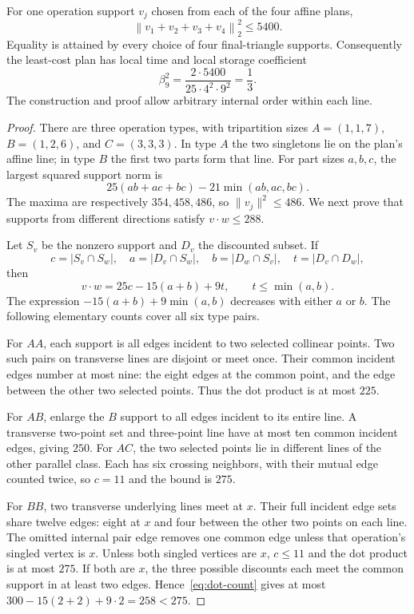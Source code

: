 \begin{theorem}\label{thm:affine}
For one operation support $v_j$ chosen from each of the four affine plans,
\[
 \left\|v_1+v_2+v_3+v_4\right\|_2^2\le5400.
\]
Equality is attained by every choice of four final-triangle supports.
Consequently the least-cost plan has local time and local storage coefficient
\begin{equation}
 \beta_9^2=\frac{2\cdot5400}{25\cdot4^2\cdot9^2}
   =\frac13.\label{eq:affine-beta}
\end{equation}
The construction and proof allow arbitrary internal order within each line.
\end{theorem}

\begin{proof}
There are three operation types, with tripartition sizes
$A=(1,1,7)$, $B=(1,2,6)$, and $C=(3,3,3)$. In type $A$ the two singletons
lie on the plan's affine line; in type $B$ the first two parts form that
line. For part sizes $a,b,c$, the largest squared support norm is
\[
 25(ab+ac+bc)-21\min(ab,ac,bc).
\]
The maxima are respectively $354,458,486$, so $\|v_j\|^2\le486$.
We next prove that supports from different directions satisfy $v\cdot w\le288$.

Let $S_v$ be the nonzero support and $D_v$ the discounted subset. If
\[
 c=|S_v\cap S_w|,\quad a=|D_v\cap S_w|,\quad
 b=|D_w\cap S_v|,\quad t=|D_v\cap D_w|,
\]
then
\begin{equation}
 v\cdot w=25c-15(a+b)+9t,\qquad t\le\min(a,b).\label{eq:dot-count}
\end{equation}
The expression $-15(a+b)+9\min(a,b)$ decreases with either $a$ or $b$.
The following elementary counts cover all six type pairs.

For $AA$, each support is all edges incident to two selected collinear
points. Two such pairs on transverse lines are disjoint or meet once.
Their common incident edges number at most nine: the eight edges at the
common point, and the edge between the other two selected points.
Thus the dot product is at most $225$.

For $AB$, enlarge the $B$ support to all edges incident to its entire line.
A transverse two-point set and three-point line have at most ten common
incident edges, giving $250$. For $AC$, the two selected points lie in
different lines of the other parallel class. Each has six crossing
neighbors, with their mutual edge counted twice, so $c=11$ and the bound
is $275$.

For $BB$, two transverse underlying lines meet at $x$. Their full incident
edge sets share twelve edges: eight at $x$ and four between the other two
points on each line. The omitted internal pair edge removes one common
edge unless that operation's singled vertex is $x$. Unless both singled
vertices are $x$, $c\le11$ and the dot product is at most $275$.
If both are $x$, the three possible discounts each meet the common support
in at least two edges. Hence~\eqref{eq:dot-count} gives at most
$300-15(2+2)+9\cdot2=258<275$.


\end{proof}

